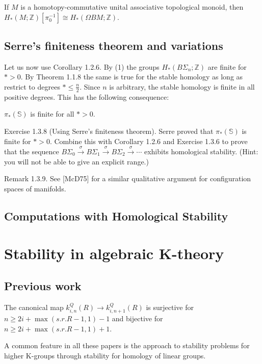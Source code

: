 \begin{theo}
     If $M$ is a homotopy-commutative unital associative topological monoid, then $H_*(M ; \mathbb{Z})\left[\pi_0^{-1}\right] \cong H_*(\Omega B M ; \mathbb{Z})$.    
\end{theo}


\section{Serre's finiteness theorem and variations}

Let us now use Corollary 1.2.6. By (1) the groups $H_*\left(B \Sigma_n ; \mathbb{Z}\right)$ are finite for $*>0$. By Theorem 1.1.8 the same is true for the stable homology as long as restrict to degrees $* \leq \frac{n}{2}$. Since $n$ is arbitrary, the stable homology is finite in all positive degrees. This has the following consequence:

\begin{theo}
$\pi_*(\mathbb{S})$ is finite for all $*>0$.
\end{theo}


Exercise 1.3.8 (Using Serre's finiteness theorem). Serre proved that $\pi_*(\mathbb{S})$ is finite for $*>0$. Combine this with Corollary 1.2.6 and Exercise 1.3.6 to prove that the sequence $B \Sigma_0 \xrightarrow{\sigma} B \Sigma_1 \xrightarrow{\sigma} B \Sigma_2 \xrightarrow{\sigma} \cdots$ exhibits homological stability. (Hint: you will not be able to give an explicit range.)

Remark 1.3.9. See [McD75] for a similar qualitative argument for configuration spaces of manifolds.

\section{Computations with Homological Stability}

\cite{wahlHomologicalStabilityTool2022}


\chapter{Stability in algebraic K-theory}


\section{Previous work}
\begin{theo}
    The canonical map $k_{i, n}^Q(R) \rightarrow k_{i, n+1}^Q(R)$ is surjective for $n \geq 2 i+\max (s . r . R-1,1)-1$ and bijective for $n \geq 2 i+\max (s . r . R-1,1)+1$. 
\end{theo}
A common feature in all these papers is the approach to stability problems for higher K-groups through stability for homology of linear groups.


